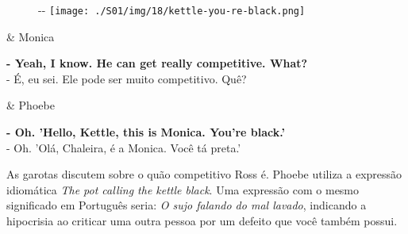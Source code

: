 \begin{figure}[!ht]
  \begin{adjustwidth}{-\oddsidemargin-1in}{-\rightmargin}
    \centering
    \texttt{[image: ./S01/img/18/kettle-you-re-black.png]}
  \end{adjustwidth}
\end{figure}

\begin{tcolorbox}[enhanced,center upper,
    drop fuzzy shadow southeast, boxrule=0.3pt,
    lower separated=false, breakable,
    colframe=black!30!dialogoBorder,colback=white]
\begin{minipage}[c]{0.16\linewidth}
   & \centering \scriptsize{Monica}
\end{minipage}
\hfill
\begin{minipage}[c]{0.8\linewidth}
  \textbf{- Yeah, I know. He can get really competitive. What?}\\
  - É, eu sei. Ele pode ser muito competitivo. Quê?
\end{minipage}

\medskip
\begin{minipage}[c]{0.16\linewidth}
   & \centering \scriptsize{Phoebe}
\end{minipage}
\hfill
\begin{minipage}[c]{0.8\linewidth}
  \textbf{- Oh. 'Hello, Kettle, this is Monica. You're black.'}\\
  - Oh. 'Olá, Chaleira, é a Monica. Você tá preta.'
\end{minipage}
\end{tcolorbox}

As garotas discutem sobre o quão competitivo Ross é. Phoebe utiliza a
expressão idiomática \emph{The pot calling the kettle black}. Uma
expressão com o mesmo significado em Português seria: \emph{O sujo
falando do mal lavado}, indicando a hipocrisia ao criticar uma outra
pessoa por um defeito que você também possui.

